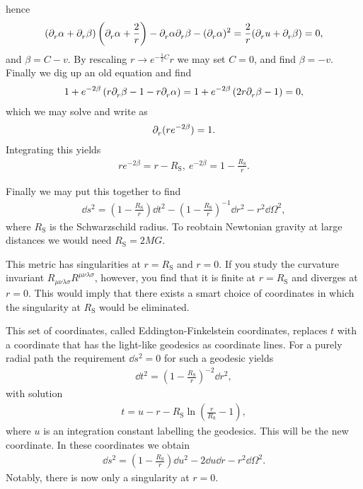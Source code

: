hence
\begin{align*}
	(\partial^{}_{r}\alpha + \partial^{}_{r}\beta)\left(\partial^{}_{r}\alpha + \frac{2}{r}\right) - \partial^{}_{r}\alpha\partial^{}_{r}\beta - (\partial^{}_{r}\alpha)^{2} = \frac{2}{r}(\partial^{}_{r}u + \partial^{}_{r}\beta) = 0,
\end{align*}
and $\beta = C - v$. By rescaling $r\to e^{-\frac{1}{2}C}r$ we may set $C = 0$, and find $\beta = -v$. Finally we dig up an old equation and find
\begin{align*}
	1 + e^{-2\beta}\left(r\partial^{}_{r}\beta - 1 - r\partial^{}_{r}\alpha\right) = 1 + e^{-2\beta}\left(2r\partial^{}_{r}\beta - 1\right) = 0,
\end{align*}
which we may solve and write as
\begin{align*}
	\partial^{}_{r}(re^{-2\beta}) = 1.
\end{align*}
Integrating this yields
\begin{align*}
	re^{-2\beta} = r - R_{\text{S}},\ e^{-2\beta} = 1 - \frac{R_{\text{S}}}{r}.
\end{align*}

Finally we may put this together to find
\begin{align*}
	\dd{s}^{2} = \left(1 - \frac{R_{\text{S}}}{r}\right)\dd{t}^{2} - \left(1 - \frac{R_{\text{S}}}{r}\right)^{-1}\dd{r}^{2} - r^{2}\dd{\Omega}^{2},
\end{align*}
where $R_{\text{S}}$ is the Schwarzschild radius. To reobtain Newtonian gravity at large distances we would need $R_{\text{S}} = 2MG$.

This metric has singularities at $r = R_{\text{S}}$ and $r = 0$. If you study the curvature invariant $R_{\mu\nu\lambda\sigma}R^{\mu\nu\lambda\sigma}$, however, you find that it is finite at $r = R_{\text{S}}$ and diverges at $r = 0$. This would imply that there exists a smart choice of coordinates in which the singularity at $R_{\text{S}}$ would be eliminated.

This set of coordinates, called Eddington-Finkelstein coordinates, replaces $t$ with a coordinate that has the light-like geodesics as coordinate lines. For a purely radial path the requirement $\dd{s}^{2} = 0$ for such a geodesic yields
\begin{align*}
	\dd{t}^{2} = \left(1 - \frac{R_{\text{S}}}{r}\right)^{-2}\dd{r}^{2},
\end{align*}
with solution
\begin{align*}
	t = u - r - R_{\text{S}}\ln(\frac{r}{R_{\text{S}}} - 1),
\end{align*}
where $u$ is an integration constant labelling the geodesics. This will be the new coordinate. In these coordinates we obtain
\begin{align*}
	\dd{s}^{2} = \left(1 - \frac{R_{\text{S}}}{r}\right)\dd{u}^{2} - 2\dd{u}\dd{r} - r^{2}\dd{\Omega}^{2}.
\end{align*}
Notably, there is now only a singularity at $r = 0$.

